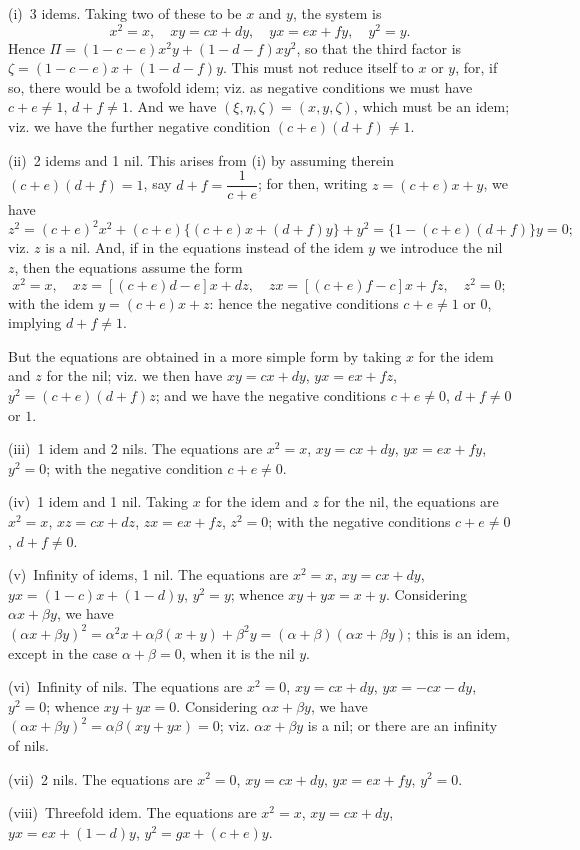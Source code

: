 \documentclass[11pt,a4paper]{book}
\begin{document}
(i)~3 idems. Taking two of these to be $x$ and $y$, the system is
\[
x^2=x,\quad xy=cx+dy,\quad yx=ex+fy,\quad y^2=y.
\]
Hence $\Pi=(1-c-e)x^2y+(1-d-f)xy^2$, so that the third factor is $\zeta=(1-c-e)x+(1-d-f)y$. This must not reduce itself to $x$ or $y$, for, if so, there would be a twofold idem; viz. as negative conditions we must have $c+e\neq 1$, $d+f\neq 1$. And we have $(\xi,\eta,\zeta)=(x,y,\zeta)$, which must be an idem; viz. we have the further negative condition $(c+e)(d+f)\neq 1$.

(ii)~2 idems and 1 nil. This arises from (i) by assuming therein $(c+e)(d+f)=1$, say $d+f=\dfrac{1}{c+e}$; for then, writing $z=(c+e)x+y$, we have
\[
z^2=(c+e)^2x^2+(c+e)\{(c+e)x+(d+f)y\}+y^2=\{1-(c+e)(d+f)\}y=0;
\]
viz. $z$ is a nil. And, if in the equations instead of the idem $y$ we introduce the nil $z$, then the equations assume the form
\[
x^2=x,\quad xz=[(c+e)d-e]x+dz,\quad zx=[(c+e)f-c]x+fz,\quad z^2=0;
\]
with the idem $y=(c+e)x+z$: hence the negative conditions $c+e\neq 1$ or $0$, implying $d+f\neq 1$.

But the equations are obtained in a more simple form by taking $x$ for the idem and $z$ for the nil; viz. we then have $xy=cx+dy$, $yx=ex+fz$, $y^2=(c+e)(d+f)z$; and we have the negative conditions $c+e\neq 0$, $d+f\neq 0$ or $1$.

(iii)~1 idem and 2 nils. The equations are $x^2=x$, $xy=cx+dy$, $yx=ex+fy$, $y^2=0$; with the negative condition $c+e\neq 0$.

(iv)~1 idem and 1 nil. Taking $x$ for the idem and $z$ for the nil, the equations are $x^2=x$, $xz=cx+dz$, $zx=ex+fz$, $z^2=0$; with the negative conditions $c+e\neq 0$, $d+f\neq 0$.

(v)~Infinity of idems, 1 nil. The equations are $x^2=x$, $xy=cx+dy$, $yx=(1-c)x+(1-d)y$, $y^2=y$; whence $xy+yx=x+y$. Considering $\alpha x+\beta y$, we have $(\alpha x+\beta y)^2=\alpha^2x+\alpha\beta(x+y)+\beta^2y=(\alpha+\beta)(\alpha x+\beta y)$; this is an idem, except in the case $\alpha+\beta=0$, when it is the nil $y$.

(vi)~Infinity of nils. The equations are $x^2=0$, $xy=cx+dy$, $yx=-cx-dy$, $y^2=0$; whence $xy+yx=0$. Considering $\alpha x+\beta y$, we have $(\alpha x+\beta y)^2=\alpha\beta(xy+yx)=0$; viz. $\alpha x+\beta y$ is a nil; or there are an infinity of nils.

(vii)~2 nils. The equations are $x^2=0$, $xy=cx+dy$, $yx=ex+fy$, $y^2=0$.

(viii)~Threefold idem. The equations are $x^2=x$, $xy=cx+dy$, $yx=ex+(1-d)y$, $y^2=gx+(c+e)y$.
\end{document}
